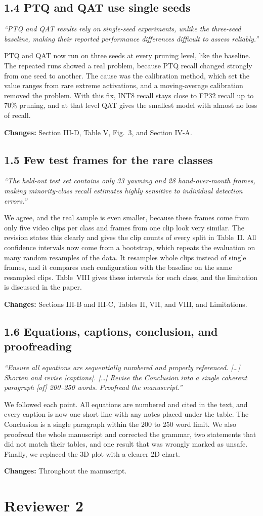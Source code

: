 \documentclass[10pt]{article}
\newcommand{\comment}[2]{\subsection*{#1}\textit{#2}\par}
\newcommand{\changes}[1]{\par\textbf{Changes:} #1}
\begin{document}
\comment{1.4 PTQ and QAT use single seeds}{``PTQ and QAT results rely on single-seed experiments, unlike the three-seed baseline, making their reported performance differences difficult to assess reliably.''}
PTQ and QAT now run on three seeds at every pruning level, like the baseline. The repeated runs showed a real problem, because PTQ recall changed strongly from one seed to another. The cause was the calibration method, which set the value ranges from rare extreme activations, and a moving-average calibration removed the problem. With this fix, INT8 recall stays close to FP32 recall up to 70\% pruning, and at that level QAT gives the smallest model with almost no loss of recall.
\changes{Section III-D, Table V, Fig.~3, and Section IV-A.}

\comment{1.5 Few test frames for the rare classes}{``The held-out test set contains only 33 yawning and 28 hand-over-mouth frames, making minority-class recall estimates highly sensitive to individual detection errors.''}
We agree, and the real sample is even smaller, because these frames come from only five video clips per class and frames from one clip look very similar. The revision states this clearly and gives the clip counts of every split in Table~II. All confidence intervals now come from a bootstrap, which repeats the evaluation on many random resamples of the data. It resamples whole clips instead of single frames, and it compares each configuration with the baseline on the same resampled clips. Table~VIII gives these intervals for each class, and the limitation is discussed in the paper.
\changes{Sections III-B and III-C, Tables II, VII, and VIII, and Limitations.}

\comment{1.6 Equations, captions, conclusion, and proofreading}{``Ensure all equations are sequentially numbered and properly referenced. [\dots] Shorten and revise [captions]. [\dots] Revise the Conclusion into a single coherent paragraph [of] 200--250 words. Proofread the manuscript.''}
We followed each point. All equations are numbered and cited in the text, and every caption is now one short line with any notes placed under the table. The Conclusion is a single paragraph within the 200 to 250 word limit. We also proofread the whole manuscript and corrected the grammar, two statements that did not match their tables, and one result that was wrongly marked as unsafe. Finally, we replaced the 3D plot with a clearer 2D chart.
\changes{Throughout the manuscript.}

\section*{Reviewer 2}
\end{document}
